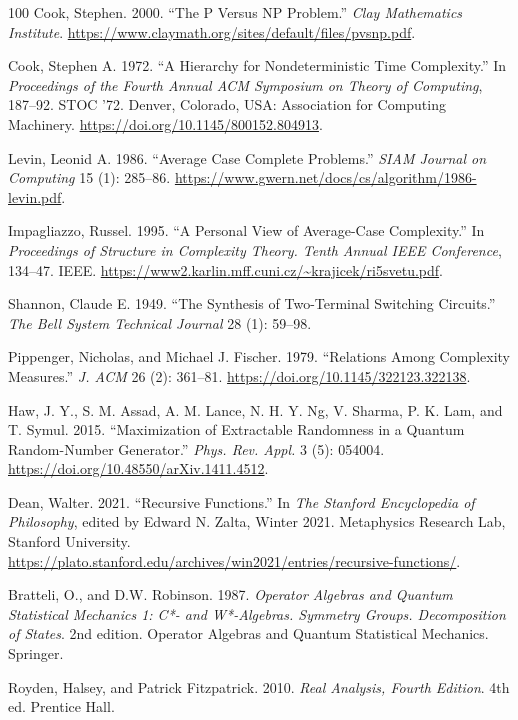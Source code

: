 \documentclass[11pt]{book}
\begin{document}
\begin{thebibliography}{100}
 Cook, Stephen. 2000. {``The P Versus NP Problem.''} \emph{Clay
Mathematics Institute}.
\url{https://www.claymath.org/sites/default/files/pvsnp.pdf}.

 Cook, Stephen A. 1972. {``A Hierarchy for Nondeterministic Time
Complexity.''} In \emph{Proceedings of the Fourth Annual ACM Symposium
on Theory of Computing}, 187--92. STOC '72. Denver, Colorado, USA:
Association for Computing Machinery.
\url{https://doi.org/10.1145/800152.804913}.

 Levin, Leonid A. 1986. {``Average Case Complete Problems.''} \emph{SIAM
Journal on Computing} 15 (1): 285--86.
\url{https://www.gwern.net/docs/cs/algorithm/1986-levin.pdf}.

 Impagliazzo, Russel. 1995. {``A Personal View of Average-Case
Complexity.''} In \emph{Proceedings of Structure in Complexity Theory.
Tenth Annual IEEE Conference}, 134--47. IEEE.
\url{https://www2.karlin.mff.cuni.cz/~krajicek/ri5svetu.pdf}.

 Shannon, Claude E. 1949. {``The Synthesis of Two-Terminal Switching
Circuits.''} \emph{The Bell System Technical Journal} 28 (1): 59--98.

 Pippenger, Nicholas, and Michael J. Fischer. 1979. {``Relations Among
Complexity Measures.''} \emph{J. ACM} 26 (2): 361--81.
\url{https://doi.org/10.1145/322123.322138}.

 Haw, J. Y., S. M. Assad, A. M. Lance, N. H. Y. Ng, V. Sharma, P. K. Lam,
and T. Symul. 2015. {``Maximization of Extractable Randomness in a
Quantum Random-Number Generator.''} \emph{Phys. Rev. Appl.} 3 (5):
054004. \url{https://doi.org/10.48550/arXiv.1411.4512}.

 Dean, Walter. 2021. {``Recursive Functions.''} In \emph{The Stanford
Encyclopedia of Philosophy}, edited by Edward N. Zalta, Winter 2021.
Metaphysics Research Lab, Stanford University.
\url{https://plato.stanford.edu/archives/win2021/entries/recursive-functions/}.

 Bratteli, O., and D.W. Robinson. 1987. \emph{Operator Algebras and
Quantum Statistical Mechanics 1: C*- and W*-Algebras. Symmetry Groups.
Decomposition of States}. 2nd edition. Operator Algebras and Quantum
Statistical Mechanics. Springer.

 Royden, Halsey, and Patrick Fitzpatrick. 2010. \emph{Real Analysis,
Fourth Edition}. 4th ed. Prentice Hall.


\end{thebibliography}
\end{document}
